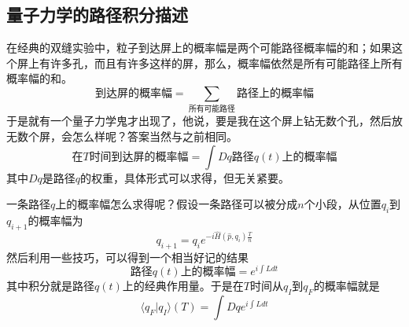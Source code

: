 \documentclass[a4paper,11pt]{ctexart}
\newcommand{\beq}{\begin{equation}}
\newcommand{\eeq}{\end{equation}}
\begin{document}
\subsection{量子力学的路径积分描述}
在经典的双缝实验中，粒子到达屏上的概率幅是两个可能路径概率幅的和；如果这个屏上有许多孔，而且有许多这样的屏，那么，概率幅依然是所有可能路径上所有概率幅的和。
\beq
\text{到达屏的概率幅} = \sum_{\text{所有可能路径}} \text{路径上的概率幅}
\eeq
于是就有一个量子力学鬼才出现了，他说，要是我在这个屏上钻无数个孔，然后放无数个屏，会怎么样呢？答案当然与之前相同。
\beq
\text{在$T$时间到达屏的概率幅} = \int Dq \text{路径$q(t)$上的概率幅}
\eeq
其中$Dq$是路径$q$的权重，具体形式可以求得，但无关紧要。
\par
一条路径$q$上的概率幅怎么求得呢？假设一条路径可以被分成$n$个小段，从位置$q_i$到$q_{i+1}$的概率幅为
\beq
q_{i+1} = q_i e^{-i \hat{H}(\hat{p},q_i) \frac{T}{n} }
\eeq
然后利用一些技巧，可以得到一个相当好记的结果
\beq
\text{路径$q(t)$上的概率幅} = e^{i \int L dt}
\eeq
其中积分就是路径$q(t)$上的经典作用量。于是在$T$时间从$q_I$到$q_F$的概率幅就是
\beq
\langle q_F | q_I \rangle(T) = \int Dq e^{i \int L dt}
\eeq
\end{document}
